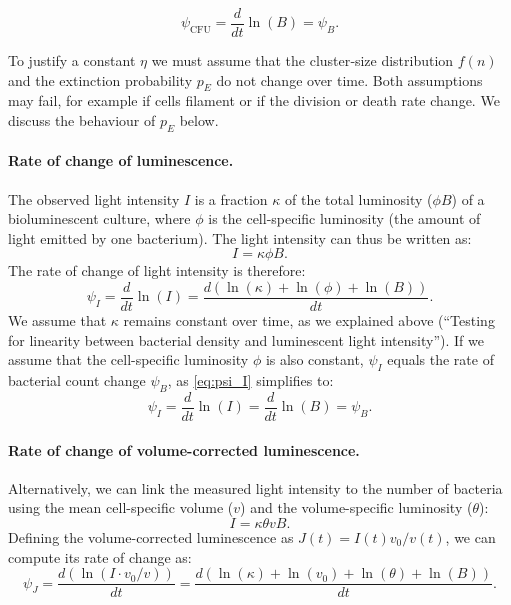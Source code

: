 \begin{equation}
  \psi_{\mathrm{CFU}} = \frac{d}{dt}\ln(B) = \psi_B.
\end{equation}

To justify a constant \(\eta\) we must assume that the cluster‐size distribution \(f(n)\) and the extinction probability \(p_E\) do not change over time.
Both assumptions may fail, for example if cells filament or if the division or death rate change.
We discuss the behaviour of \(p_E\) below.

\paragraph{Rate of change of luminescence.}
The observed light intensity $I$ is a fraction $\kappa$ of the total luminosity ($\phi B$) of a bioluminescent culture, where $\phi$ is the cell-specific luminosity (the amount of light emitted by one bacterium).
The light intensity can thus be written as:
\begin{equation}
  I = \kappa \phi B.
\end{equation}
The rate of change of light intensity is therefore:
\begin{equation}
  \psi_I = \frac{d}{dt}\ln(I) = \frac{d(\ln(\kappa) + \ln(\phi) + \ln(B))}{dt}.\label{eq:psi_I}
\end{equation}
We assume that $\kappa$ remains constant over time, as we explained above (``Testing for linearity between bacterial density and luminescent light intensity'').
If we assume that the cell-specific luminosity $\phi$ is also constant, $\psi_I$ equals the rate of bacterial count change $\psi_B$, as \autoref{eq:psi_I} simplifies to:
\begin{equation}
  \psi_I = \frac{d}{dt}\ln(I)  = \frac{d}{dt}\ln(B)  = \psi_B.
\end{equation}

\paragraph{Rate of change of volume-corrected luminescence.}
Alternatively, we can link the measured light intensity to the number of bacteria using the mean cell-specific volume ($v$) and the volume-specific luminosity ($\theta$):
\begin{equation}
  I = \kappa \theta v B. \label{eq:I_vol}
\end{equation}
Defining the volume-corrected luminescence as $J(t) = I(t) v_0/v(t)$, we can compute its rate of change as:
\begin{equation}
  \psi_J = \frac{d(\ln(I \cdot v_0/v))}{dt} = \frac{d(\ln(\kappa) + \ln(v_0) + \ln(\theta) + \ln(B))}{dt}. \label{eq:psi_J}
\end{equation}

